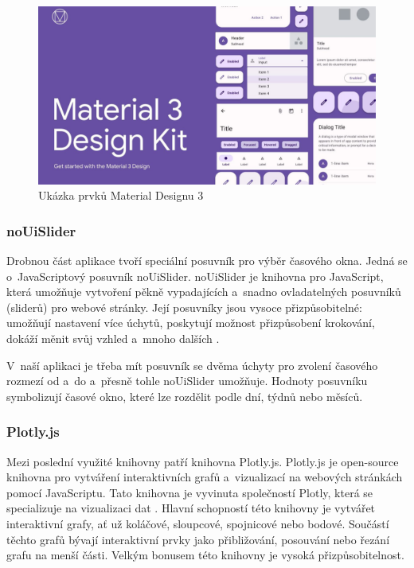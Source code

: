 \begin{figure}[h]
	\centering
	\includegraphics[width=1\textwidth]{Pictures/m3.jpg}
	\caption{Ukázka prvků Material Designu 3 \cite{md3-pic}}
	\label{fig:MD3pic}
\end{figure}

\subsubsection*{noUiSlider}

Drobnou část aplikace tvoří speciální posuvník pro výběr časového okna. Jedná se o~JavaScriptový posuvník noUiSlider. noUiSlider je knihovna pro JavaScript, která umožňuje vytvoření pěkně vypadajících a~snadno ovladatelných posuvníků (sliderů) pro webové stránky. Její posuvníky jsou vysoce přizpůsobitelné: umožňují nastavení více úchytů, poskytují možnost přizpůsobení krokování, dokáží měnit svůj vzhled a~mnoho dalších \cite{nouislider}.

V~naší aplikaci je třeba mít posuvník se dvěma úchyty pro zvolení časového rozmezí od a~do a~přesně tohle noUiSlider umožňuje. Hodnoty posuvníku symbolizují časové okno, které lze rozdělit podle dní, týdnů nebo měsíců.

\subsubsection*{Plotly.js}
\label{plotly}

Mezi poslední využité knihovny patří knihovna Plotly.js. Plotly.js je open-source knihovna pro vytváření interaktivních grafů a~vizualizací na webových stránkách pomocí JavaScriptu. Tato knihovna je vyvinuta společností Plotly, která se specializuje na vizualizaci dat \cite{plotly}. Hlavní schopností této knihovny je vytvářet interaktivní grafy, ať už koláčové, sloupcové, spojnicové nebo bodové. Součástí těchto grafů bývají interaktivní prvky jako přibližování, posouvání nebo řezání grafu na menší části. Velkým bonusem této knihovny je vysoká přizpůsobitelnost. 

